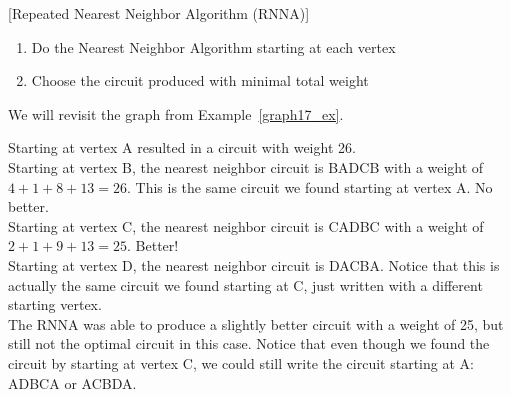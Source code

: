 \begin{algorithm}{}{}[Repeated Nearest Neighbor Algorithm (RNNA)]
\hspace{3in}
\begin{enumerate}
\item	Do the Nearest Neighbor Algorithm starting at each vertex
\item	Choose the circuit produced with minimal total weight
\end{enumerate}
\end{algorithm}

\begin{example}{} %
We will revisit the graph from Example~\ref{graph17_ex}.\\
\begin{center}
\end{center}

Starting at vertex A resulted in a circuit with weight 26.\\

Starting at vertex B, the nearest neighbor circuit is BADCB with a weight of $4+1+8+13 = 26$.  This is the same circuit we found starting at vertex A.  No better.\\

Starting at vertex C, the nearest neighbor circuit is CADBC with a weight of $2+1+9+13 = 25$.  Better!\\

Starting at vertex D, the nearest neighbor circuit is DACBA.  Notice that this is actually the same circuit we found starting at C, just written with a different starting vertex.\\

The RNNA was able to produce a slightly better circuit with a weight of 25, but still not the optimal circuit in this case.  Notice that even though we found the circuit by starting at vertex C, we could still write the circuit starting at A:  ADBCA or ACBDA.
\end{example}

